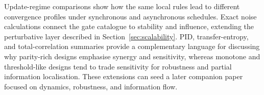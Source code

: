 \documentclass[11pt]{article}
\theoremstyle{definition}
\begin{document}
Update-regime comparisons show how the same local rules lead to different convergence profiles under synchronous and asynchronous schedules. Exact noise calculations connect the gate catalogue to stability and influence, extending the perturbative layer described in Section~\ref{sec:scalability}. PID, transfer-entropy, and total-correlation summaries provide a complementary language for discussing why parity-rich designs emphasise synergy and sensitivity, whereas monotone and threshold-like designs tend to trade sensitivity for robustness and partial information localisation. These extensions can seed a later companion paper focused on dynamics, robustness, and information flow.



\end{document}
